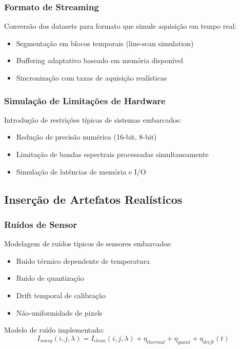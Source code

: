 \subsubsection{Formato de Streaming}
Conversão dos datasets para formato que simule aquisição em tempo real:
\begin{itemize}
    \item Segmentação em blocos temporais (line-scan simulation)
    \item Buffering adaptativo baseado em memória disponível
    \item Sincronização com taxas de aquisição realísticas
\end{itemize}

\subsubsection{Simulação de Limitações de Hardware}
Introdução de restrições típicas de sistemas embarcados:
\begin{itemize}
    \item Redução de precisão numérica (16-bit, 8-bit)
    \item Limitação de bandas espectrais processadas simultaneamente
    \item Simulação de latências de memória e I/O
\end{itemize}

\subsection{Inserção de Artefatos Realísticos}

\subsubsection{Ruídos de Sensor}
Modelagem de ruídos típicos de sensores embarcados:
\begin{itemize}
    \item Ruído térmico dependente de temperatura
    \item Ruído de quantização
    \item Drift temporal de calibração
    \item Não-uniformidade de pixels
\end{itemize}

Modelo de ruído implementado:
\begin{equation}
I_{noisy}(i,j,\lambda) = I_{clean}(i,j,\lambda) + \eta_{thermal} + \eta_{quant} + \eta_{drift}(t)
\end{equation}

